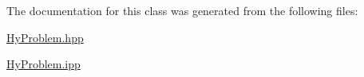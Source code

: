 The documentation for this class was generated from the following files:\begin{DoxyCompactItemize}
\item 
\hyperlink{HyProblem_8hpp}{HyProblem.hpp}\item 
\hyperlink{HyProblem_8ipp}{HyProblem.ipp}\end{DoxyCompactItemize}
